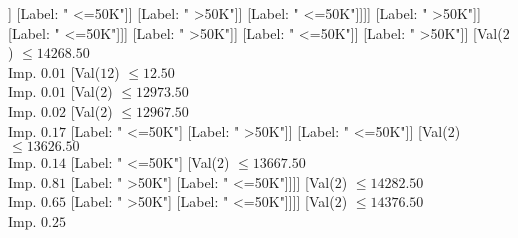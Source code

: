 \documentclass[margin=10pt]{standalone}
\begin{document}
\begin{forest}
																																															[Val($2$) $ \leq 11980.50$ \\ Imp. $0.10$
																																																[Val($2$) $ \leq 11978.50$ \\ Imp. $0.17$
																																																	[Val($2$) $ \leq 11880.50$ \\ Imp. $0.16$
																																																		[Val($2$) $ \leq 11866.50$ \\ Imp. $0.31$
																																																			[Label: " <=50K"]
																																																			[Label: " >50K"]]
																																																		[Label: " <=50K"]]
																																																	[Label: " >50K"]]
																																																[Label: " <=50K"]]]]
																																													[Label: " >50K"]]
																																												[Label: " <=50K"]]]
																																										[Label: " >50K"]]
																																									[Label: " <=50K"]]
																																								[Label: " >50K"]]
																																							[Val($2$) $ \leq 14268.50$ \\ Imp. $0.01$
																																								[Val($12$) $ \leq 12.50$ \\ Imp. $0.01$
																																									[Val($2$) $ \leq 12973.50$ \\ Imp. $0.02$
																																										[Val($2$) $ \leq 12967.50$ \\ Imp. $0.17$
																																											[Label: " <=50K"]
																																											[Label: " >50K"]]
																																										[Label: " <=50K"]]
																																									[Val($2$) $ \leq 13626.50$ \\ Imp. $0.14$
																																										[Label: " <=50K"]
																																										[Val($2$) $ \leq 13667.50$ \\ Imp. $0.81$
																																											[Label: " >50K"]
																																											[Label: " <=50K"]]]]
																																								[Val($2$) $ \leq 14282.50$ \\ Imp. $0.65$
																																									[Label: " >50K"]
																																									[Label: " <=50K"]]]]
																																						[Val($2$) $ \leq 14376.50$ \\ Imp. $0.25$

\end{forest}
\end{document}
